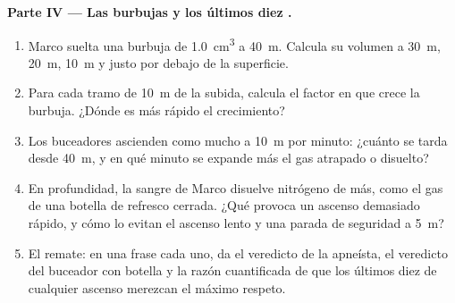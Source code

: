 \begin{problem}
\medskip
\noindent\textbf{Parte IV --- Las burbujas y los últimos diez .}
\begin{enumerate}[resume]
  \item Marco suelta una burbuja de \qty{1.0}{cm^3} a \qty{40}{m}.
        Calcula su volumen a \qty{30}{m}, \qty{20}{m}, \qty{10}{m} y
        justo por debajo de la superficie.
  \item Para cada tramo de \qty{10}{m} de la subida, calcula el factor
        en que crece la burbuja. ¿Dónde es más rápido el crecimiento?
  \item Los buceadores ascienden como mucho a \qty{10}{m} por minuto:
        ¿cuánto se tarda desde \qty{40}{m}, y en qué minuto se expande
        más el gas atrapado o disuelto?
  \item En profundidad, la sangre de Marco disuelve nitrógeno de más,
        como el gas de una botella de refresco cerrada. ¿Qué provoca un
        ascenso demasiado rápido, y cómo lo evitan el ascenso lento y
        una parada de seguridad a \qty{5}{m}?
  \item El remate: en una frase cada uno, da el veredicto de la
        apneísta, el veredicto del buceador con botella y la razón
        cuantificada de que los últimos diez  de cualquier ascenso
        merezcan el máximo respeto.
\end{enumerate}
\end{problem}
